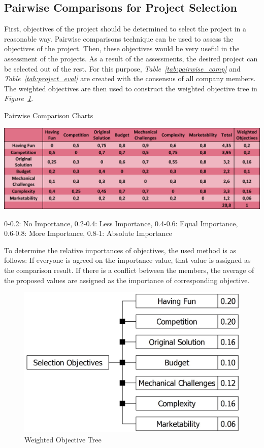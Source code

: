 \documentclass[a4paper,12pt]{article}
\begin{document}
	\subsection{Pairwise Comparisons for Project Selection}
		First, objectives of the project should be determined to select the project in a reasonable way. Pairwise comparisons technique can be used to assess the objectives of the project. Then, these objectives would be very useful in the assessment of the projects. As a result of the assessments, the desired project can be selected out of the rest. For this purpose, \textit{Table~\ref{tab:pairwise_comp}} and \textit{Table~\ref{tab:project_eval}} are created with the consensus of all company members. The weighted objectives are then used to construct the weighted objective tree in \textit{Figure~\ref{fig:objective_tree}}. 
		


	\begin{table}[H]
		\centering
		\caption{\label{tab:pairwise_comp}Pairwise Comparison Charts}\vspace{-.2cm}
		\includegraphics[width=\textwidth]{images/objective_tree3} 
	\vspace*{-.9cm}	\begin{center}
		{\small 0-0.2: No Importance, 0.2-0.4: Less Importance, 0.4-0.6: Equal Importance,\\ 0.6-0.8: More Importance, 0.8-1: Absolute Importance }	
		\end{center}
	\end{table}	\vspace*{-.5cm}	
	To determine the relative importances of objectives, the used method is as follows: If everyone is agreed on the importance value, that value is assigned as the comparison result. If there is a conflict between the members, the average of the proposed values are assigned as the importance of corresponding objective.
	\begin{figure}[H]
		\centering
		\includegraphics[width=.6\textwidth]{pre-objective-tree/pre-objective-tree} 
		\caption{\label{fig:objective_tree}Weighted Objective Tree}
	\end{figure}
	
\end{document}
